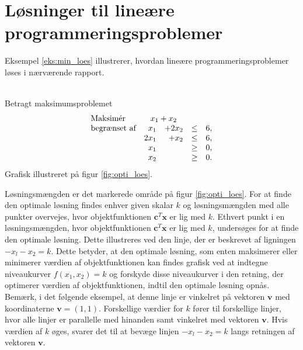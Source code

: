 \section{Løsninger til lineære programmeringsproblemer}
%
\label{heeeeejjulle}
Eksempel \ref{eks:min_loes} illustrerer, hvordan lineære programmeringsproblemer løses i nærværende rapport.
\\\\
\begin{eks}\label{eks:min_loes}
Betragt maksimumsproblemet
%
\begin{align*}
\begin{array}{lrrlr}
\text{Maksimér}		&	\multicolumn{2}{c}{x_1+x_2}  &\\
\text{begrænset af}	&x_1& + 2x_2			&\leq 	& 6,\\
					&2x_1& + x_2			&\leq	& 6,\\
					&x_1&    				&\geq	& 0,\\
					&x_2&    				&\geq	& 0.\\
\end{array}
\end{align*}
%
Grafisk illustreret på figur \ref{fig:opti_loes}.
%

%
\noindent
Løsningsmængden er det markerede område på figur \ref{fig:opti_loes}. 
For at finde den optimale løsning findes enhver given skalar $k$ og løsningsmængden med alle punkter overvejes, hvor objektfunktionen $\textbf{c}^T\textbf{x}$ er lig med $k$. 
Ethvert punkt i en løsningsmængden, hvor objektfunktionen $\textbf{c}^T\textbf{x}$ er lig med $k$, undersøges for at finde den optimale løsning.
Dette illustreres ved den linje, der er beskrevet af ligningen $-x_l-x_2=k$. 
Dette betyder, at den optimale løsning, som enten maksimerer eller minimerer værdien af objektfunktionen kan findes grafisk ved at indtegne niveaukurver $f(x_1, x_2)=k$ og forskyde disse niveaukurver i den retning, der optimerer værdien af objektfunktionen, indtil den optimale løsning opnås.  
Bemærk, i det følgende eksempel, at denne linje er vinkelret på vektoren $\textbf{v}$ med koordinaterne $\textbf{v}=(1,1)$.
Forskellige værdier for $k$ fører til forskellige linjer, hvor  alle linjer er parallelle med hinanden samt vinkelret med vektoren $\textbf{v}$. 
Hvis værdien af $k$ øges, svarer det til at bevæge linjen $-x_l-x_2=k$ langs retningen af vektoren $\textbf{v}$. 

\end{eks}
